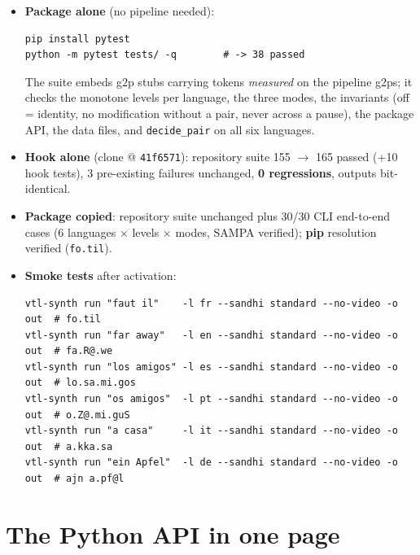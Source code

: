 \documentclass[11pt,a4paper]{report}
\newcommand{\smp}[1]{\texttt{#1}}          %
\begin{document}
\begin{itemize}
  \item \textbf{Package alone} (no pipeline needed):
\begin{verbatim}
pip install pytest
python -m pytest tests/ -q        # -> 38 passed
\end{verbatim}
        The suite embeds g2p stubs carrying tokens \emph{measured} on the
        pipeline g2ps; it checks the monotone levels per language, the
        three modes, the invariants (off = identity, no modification
        without a pair, never across a pause), the package API, the data
        files, and \smp{decide\_pair} on all six languages.
  \item \textbf{Hook alone} (clone @ \smp{41f6571}): repository suite
        155 $\rightarrow$ 165 passed (+10 hook tests), 3 pre-existing
        failures unchanged, \textbf{0 regressions}, outputs bit-identical.
  \item \textbf{Package copied}: repository suite unchanged plus 30/30
        CLI end-to-end cases (6 languages $\times$ levels $\times$ modes,
        SAMPA verified); \textbf{pip} resolution verified
        (\smp{fo.til}).
  \item \textbf{Smoke tests} after activation:
{\footnotesize
\begin{verbatim}
vtl-synth run "faut il"    -l fr --sandhi standard --no-video -o out  # fo.til
vtl-synth run "far away"   -l en --sandhi standard --no-video -o out  # fa.R@.we
vtl-synth run "los amigos" -l es --sandhi standard --no-video -o out  # lo.sa.mi.gos
vtl-synth run "os amigos"  -l pt --sandhi standard --no-video -o out  # o.Z@.mi.guS
vtl-synth run "a casa"     -l it --sandhi standard --no-video -o out  # a.kka.sa
vtl-synth run "ein Apfel"  -l de --sandhi standard --no-video -o out  # ajn a.pf@l
\end{verbatim}
}
\end{itemize}

\section{The Python API in one page}
\end{document}
